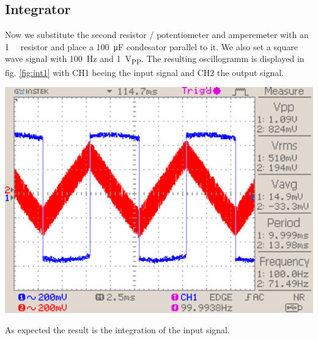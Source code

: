 \documentclass[a4paper,10pt]{article}
\newenvironment{Figure}
        {\par\medskip\noindent\minipage{\linewidth}}
        {\endminipage\par\medskip}
\numberwithin{equation}{section}
\begin{document}
\begin{multicols}{2}
  \subsection{Integrator}
  Now we substitute the second resistor / potentiometer and amperemeter with an \SI{1}{\mega \Omega} resistor and place a \SI{100}{\micro F} condesator parallel to it. We also set a square wave signal with \SI{100}{Hz} and \SI{1}{V_{PP}}. The resulting oscillogramm is displayed in fig. \ref{fig:int1} with CH1 beeing the input signal and CH2 the output signal.
	\begin{Figure}
		\centering
		\includegraphics[width=1\textwidth]{../data/DS0032_n.png}
		\label{fig:int1}
	\end{Figure}
  As expected the result is the integration of the input signal.
  

\end{multicols}
\end{document}
